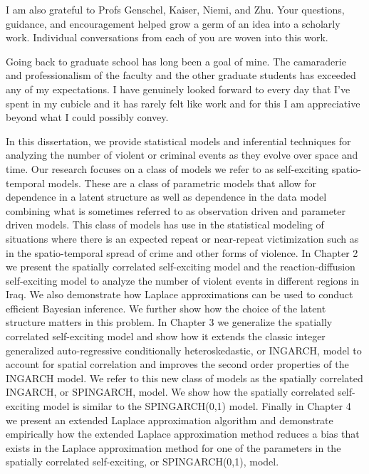 \documentclass[11pt]{isuthesis}
\begin{document}
I am also grateful to Profs Genschel, Kaiser, Niemi, and Zhu.  Your questions, guidance, and encouragement helped grow a germ of an idea into a scholarly work.  Individual conversations from each of you are woven into this work.

Going back to graduate school has long been a goal of mine.  The camaraderie and professionalism of the faculty and the other graduate students has exceeded any of my expectations.  I have genuinely looked forward to every day that I've spent in my cubicle and it has rarely felt like work and for this I am appreciative beyond what I could possibly convey.
\cleardoublepage {}
{}

In this dissertation, we provide statistical models and inferential techniques for analyzing the number of violent or criminal events as they evolve over space and time.  Our research focuses on a class of models we refer to as self-exciting spatio-temporal models.  These are a class of parametric models that allow for dependence in a latent structure as well as dependence in the data model combining what is sometimes referred to as observation driven and parameter driven models.  This class of models has use in the statistical modeling of situations where there is an expected repeat or near-repeat victimization such as in the spatio-temporal spread of crime and other forms of violence. In Chapter 2 we present the spatially correlated self-exciting model and the reaction-diffusion self-exciting model to analyze the number of violent events in different regions in Iraq.  We also demonstrate how Laplace approximations can be used to conduct efficient Bayesian inference.  We further show how the choice of the latent structure matters in this problem.  In Chapter 3 we generalize the spatially correlated self-exciting model and show how it extends the classic integer generalized auto-regressive conditionally heteroskedastic, or INGARCH, model to account for spatial correlation and improves the second order properties of the INGARCH model.  We refer to this new class of models as the spatially correlated INGARCH, or SPINGARCH, model.  We show how the spatially correlated self-exciting model is similar to the SPINGARCH(0,1) model.  Finally in Chapter 4 we present an extended Laplace approximation algorithm and demonstrate empirically how the extended Laplace approximation method reduces a bias that exists in the Laplace approximation method for one of the parameters in the spatially correlated self-exciting, or SPINGARCH(0,1), model. 
\newpage
{}
\end{document}
